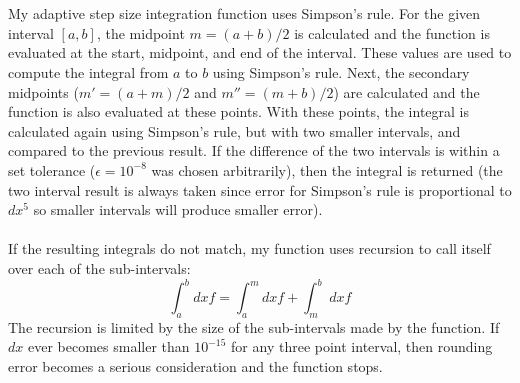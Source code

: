 \documentclass{article}
\newcommand{\<}[1]{\left\langle #1 \right\rangle }
\begin{document}
\section{}
My adaptive step size integration function uses Simpson's rule. For the given interval $[a, b]$, the midpoint $m = (a+b)/2$ is calculated and the function is evaluated at the start, midpoint, and end of the interval. These values are used to compute the integral from $a$ to $b$ using Simpson's rule. Next, the secondary midpoints ($m' = (a+m)/2$ and $m'' = (m+b)/2$) are calculated and the function is also evaluated at these points. With these points, the integral is calculated again using Simpson's rule, but with two smaller intervals, and compared to the previous result. If the difference of the two intervals is within a set tolerance ($\epsilon = 10^{-8}$ was chosen arbitrarily), then the integral is returned (the two interval result is always taken since error for Simpson's rule is proportional to $dx^5$ so smaller intervals will produce smaller error).\\
\\
If the resulting integrals do not match, my function uses recursion to call itself over each of the sub-intervals:
\[\int_a^b dx f = \int_a^m dx f + \int_m^b dx f \]
The recursion is limited by the size of the sub-intervals made by the function. If $dx$ ever becomes smaller than $10^{-15}$ for any three point interval, then rounding error becomes a serious consideration and the function stops.
 

\section{}
\end{document}
